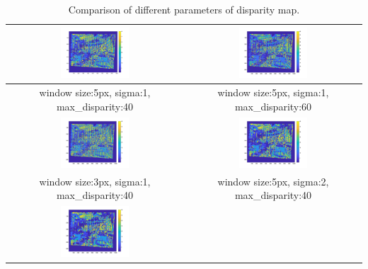 \begin{longtable}[h!]{|c|c|}
	\caption{Comparison of different parameters of disparity map.}
	\label{tab:table1}\\
	\hline
	\includegraphics[width=0.4\textwidth]{../code/win5sig1.png} & 
	\includegraphics[width=0.4\textwidth]{../code/win5sig1disp60.png} \\
	\hline
	window size:5px, sigma:1, max\_disparity:40 &window size:5px, sigma:1, max\_disparity:60\\
	\hline
	\includegraphics[width=0.4\textwidth]{../code/win3sig1.png} & 
	\includegraphics[width=0.4\textwidth]{../code/win5sig2.png} \\
	\hline
	window size:3px, sigma:1, max\_disparity:40 &window size:5px, sigma:2, max\_disparity:40\\
	\hline
	\includegraphics[width=0.4\textwidth]{../code/win9sig1.png} & 

\end{longtable}
